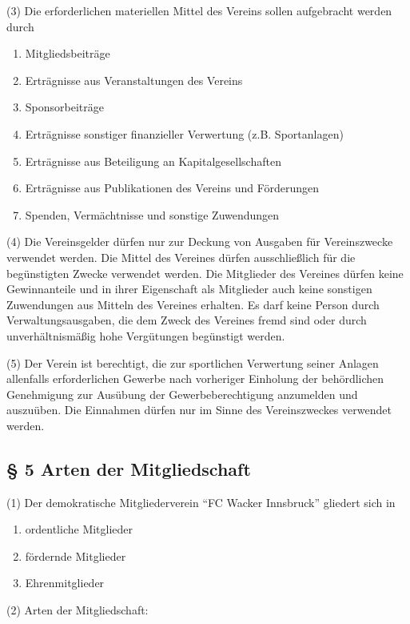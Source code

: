 \documentclass[10pt,a4paper]{article}
\begin{document}
(3)
Die erforderlichen materiellen Mittel des Vereins sollen aufgebracht werden durch

\begin{enumerate}[label=\alph*)]
\item
Mitgliedsbeiträge
\item
Erträgnisse aus Veranstaltungen des Vereins
\item
Sponsorbeiträge
\item
Erträgnisse sonstiger finanzieller Verwertung (z.B. Sportanlagen)
\item
Erträgnisse aus Beteiligung an Kapitalgesellschaften
\item
Erträgnisse aus Publikationen des Vereins und Förderungen
\item
Spenden, Vermächtnisse und sonstige Zuwendungen
\end{enumerate}

(4)
Die Vereinsgelder dürfen nur zur Deckung von Ausgaben für Vereinszwecke verwendet werden.
Die Mittel des Vereines dürfen ausschließlich für die begünstigten Zwecke verwendet werden.
Die Mitglieder des Vereines dürfen keine Gewinnanteile und in ihrer Eigenschaft als Mitglieder auch keine sonstigen Zuwendungen aus Mitteln des Vereines erhalten.
Es darf keine Person durch Verwaltungsausgaben, die dem Zweck des Vereines fremd sind oder durch unverhältnismäßig hohe Vergütungen begünstigt werden.

(5)
Der Verein ist berechtigt, die zur sportlichen Verwertung seiner Anlagen allenfalls erforderlichen Gewerbe nach vorheriger Einholung der behördlichen Genehmigung zur Ausübung der Gewerbeberechtigung anzumelden und auszuüben.
Die Einnahmen dürfen nur im Sinne des Vereinszweckes verwendet werden.

\subsection{§ 5
Arten der Mitgliedschaft}

(1)
Der demokratische Mitgliederverein "`FC Wacker Innsbruck"' gliedert sich in

\begin{enumerate}[label=\alph*)]
\item
ordentliche Mitglieder
\item
fördernde Mitglieder
\item
Ehrenmitglieder
\end{enumerate}

(2)
Arten der Mitgliedschaft:
\end{document}
